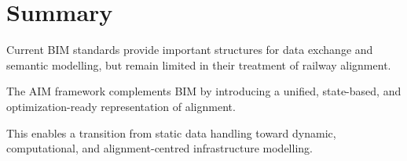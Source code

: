 \section{Summary}

\begin{summary}
Current BIM standards provide important structures for data exchange and
semantic modelling, but remain limited in their treatment of railway
alignment.

The AIM framework complements BIM by introducing a unified,
state-based, and optimization-ready representation of alignment.

This enables a transition from static data handling toward dynamic,
computational, and alignment-centred infrastructure modelling.
\end{summary}
